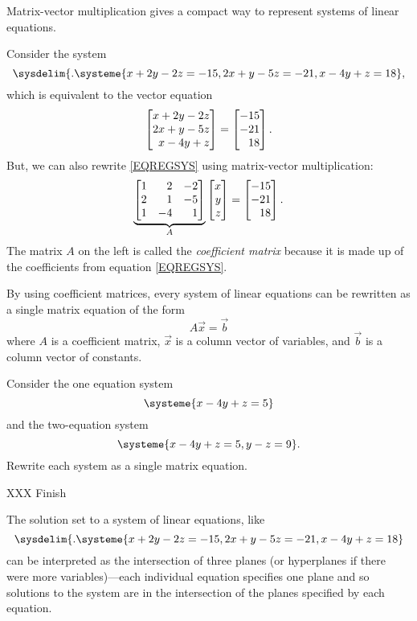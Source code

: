 Matrix-vector multiplication gives a compact way to represent systems of linear equations.

Consider the system
\begin{equation}
	\label{EQREGSYS}
	\sysdelim\{.
		\systeme{
			x+2y-2z=-15,
			2x+y-5z=-21,
			x-4y+z=18
		},
\end{equation}
which is equivalent to the vector equation
\[
	\mat{x+2y-2z\\
           2x+y-5z\\
	     x-4y+z}=\mat{-15\\-21\\18}.
\]
But, we can also rewrite \eqref{EQREGSYS} using matrix-vector multiplication:
\[
	\underbrace{\mat{1&2&-2\\2&1&-5\\1&-4&1}}_{A}\mat{x\\y\\z}=\mat{-15\\-21\\18}.
\]
The matrix $A$ on the left is called the \emph{coefficient matrix} because it
is made up of the coefficients from equation \eqref{EQREGSYS}.

By using coefficient matrices, every system of linear equations can be rewritten as a single matrix equation
of the form
\[
	A\vec x=\vec b
\]
where $A$ is a coefficient matrix, $\vec x$ is a column vector of variables, and $\vec b$ 
is a column vector of constants.

\begin{example}
	Consider the one equation system
	\begin{equation}
		\label{EQSYS1}
		\systeme{x-4y+z=5}
	\end{equation}
	and the two-equation system
	\begin{equation}
		\label{EQSYS2}
		\systeme{x-4y+z=5, y-z=9}.
	\end{equation}
	Rewrite each system as a single matrix equation.

	XXX Finish
\end{example}


The solution set to a system of linear equations, like
\begin{equation}
	\label{EQREGSYSb}
	\sysdelim\{.
		\systeme{
			x+2y-2z=-15,
			2x+y-5z=-21,
			x-4y+z=18
		}
\end{equation}
can be interpreted as the intersection of three planes (or hyperplanes if there were more variables)---each individual equation
specifies one plane and so solutions to the system are in the intersection of the planes specified by each equation.

